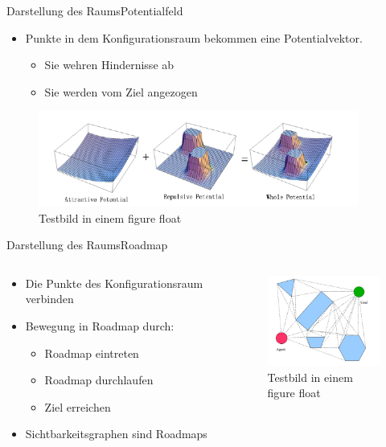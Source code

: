 \documentclass[t,aspectratio=169,dvipsnames]{beamer}
\begin{document}
\begin{frame}{Darstellung des Raums}{Potentialfeld}
			\begin{itemize}
				\item Punkte in dem Konfigurationsraum bekommen eine Potentialvektor.
				\begin{itemize}
					\item Sie wehren Hindernisse ab
					\item Sie werden vom Ziel angezogen
				\end{itemize}
			\end{itemize}
		
			\begin{figure}
				\includegraphics[width=10.5cm]{images/Potential_Field.png}
				\caption{Testbild in einem figure float} 
			\end{figure}
\end{frame}
\begin{frame}{Darstellung des Raums}{Roadmap}
	\begin{columns}
		\begin{column}[T]{0.6\textwidth}
			\begin{itemize}
				\item Die Punkte des Konfigurationsraum verbinden
				\item Bewegung in Roadmap durch:
				\begin{itemize}
					\item Roadmap eintreten
					\item Roadmap durchlaufen
					\item Ziel erreichen
				\end{itemize}
				\item Sichtbarkeitsgraphen sind Roadmaps	
			\end{itemize}
		\end{column}
		\begin{column}[T]{0.4\textwidth}
			\begin{figure}
				\includegraphics[width=4.5cm]{images/Bild3.png}
				\caption{Testbild in einem figure float} 
			\end{figure}
		\end{column}
	\end{columns}
\end{frame}
\end{document}
